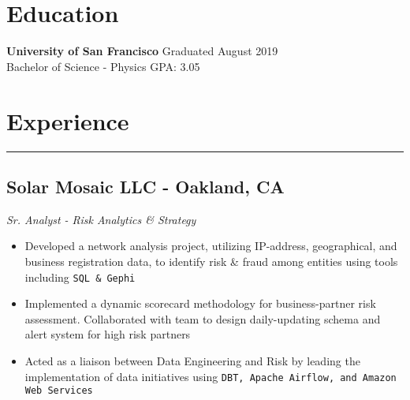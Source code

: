 \documentclass[11pt,a4paper]{article}
\newenvironment{myitemize}
{ \begin{itemize}[label={--}, leftmargin=*]
    \setlength{\itemsep}{0pt}
    \setlength{\parskip}{0pt}
    \setlength{\parsep}{0pt}     }
{ \end{itemize}                  }
\begin{document}
\section*{\\Education}
\vspace{-7mm} %
\noindent\makebox[\linewidth]{\rule{\textwidth}{0.4pt}}
\textbf{University of San Francisco} \hfill Graduated August 2019 \\
Bachelor of Science - Physics \hfill GPA: 3.05



\section*{Experience}
\vspace{-3mm} %
\hrule
\vspace{3mm} %

\subsection*{Solar Mosaic LLC - Oakland, CA \hfill {} }
\vspace{-1.5mm} %
\textit{Sr. Analyst - Risk Analytics \& Strategy}
\vspace{-1.5mm} %
\begin{myitemize}
\item Developed a network analysis project, utilizing IP-address, geographical, and business registration data, to identify risk \& fraud among entities using tools including \texttt{SQL \& Gephi}
\item Implemented a dynamic scorecard methodology for business-partner risk assessment. Collaborated with team to design daily-updating schema and alert system for high risk partners
\item Acted as a liaison between Data Engineering and Risk by leading the implementation of data initiatives using \texttt{DBT, Apache Airflow, and Amazon Web Services}
\end{myitemize}
\end{document}
